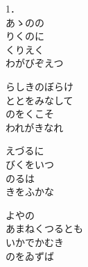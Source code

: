 \documentclass[10pt,b5j]{tarticle} %
\begin{document}
\vspace{1.5em} %
\newcommand{\linespace}{0.5em} %
\newcommand{\blocksize}{0.5\hsize} %
\begin{enumerate} %
    \begin{minipage}[c]{\blocksize}
    
        \vspace{\linespace}
        \item
        1．\\
        あゝのの\\
        りくのに\\
        くりえく\\
        わがびぞえつ
        
        \vspace{\linespace}
        \item
        らしきのぼらけ\\
        ととをみなして\\
        のをくこそ\\
        われがきなれ
        
        \vspace{\linespace}
        \item
        えづるに\\
        びくをいつ\\
        のるは\\
        きをふかな
        
        \vspace{\linespace}
        \item
        よやの\\
        あまねくつるとも\\
        いかでかむき\\
        のをゐずば
        

\end{minipage}
\end{enumerate}
\end{document}
